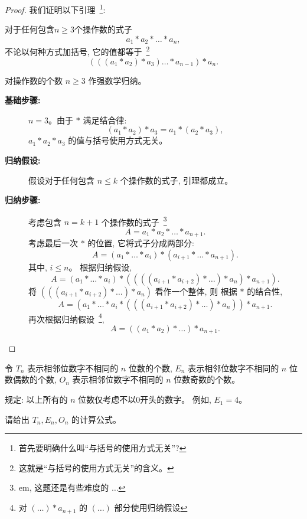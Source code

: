 \documentclass[a4paper, justified]{tufte-handout}
\begin{document}
\begin{proof}
  我们证明以下引理~\footnote{首先要明确什么叫``与括号的使用方式无关''?}:
  \begin{lemma*}
    对于任何包含$n \ge 3$个操作数的式子
    \[
      a_{1} \ast a_{2} \ast \dots \ast a_{n},
    \]
    不论以何种方式加括号, 它的值都等于~\footnote{这就是``与括号的使用方式无关''的含义。}
    \[
      (((a_{1} \ast a_{2}) \ast a_{3}) \dots \ast a_{n-1}) \ast a_{n}.
    \]
  \end{lemma*}

  \vspace{1em}
  \noindent 对操作数的个数 $n \ge 3$ 作强数学归纳。
  \begin{description}
    \item[{\bf 基础步骤:}] $n = 3$。由于 $\ast$ 满足结合律:
      \[
        (a_{1} \ast a_{2}) \ast a_{3} = a_{1} \ast (a_{2} \ast a_{3}),
      \]
      $a_{1} \ast a_{2} \ast a_{3}$ 的值与括号使用方式无关。
    \item[{\bf 归纳假设:}] 假设对于任何包含 $n \le k$ 个操作数的式子, 引理都成立。
    \item[{\bf 归纳步骤:}] 考虑包含 $n = k + 1$ 个操作数的式子~\footnote{em, 这题还是有些难度的 $\dots$}
      \[
        A = a_{1} \ast a_{2} \ast \dots \ast a_{n+1}.
      \]
      考虑最后一次 $\ast$ 的位置, 它将式子分成两部分:
      \[
        A = (a_{1} \ast \dots \ast a_{i}) \ast (a_{i+1} \ast \dots \ast a_{n+1}).
      \]
      其中, $i \le n$。
      根据归纳假设,
      \[
        A = (a_{1} \ast \dots \ast a_{i}) \ast
          (\boxed{(((a_{i+1} \ast a_{i+2}) \ast \dots) \ast a_{n})} \ast a_{n+1}).
      \]
      将 $\boxed{(((a_{i+1} \ast a_{i+2}) \ast \dots) \ast a_{n})}$ 看作一个整体, 则
      根据 $\ast$ 的结合性,
      \[
        A = (a_{1} \ast \dots \ast a_{i} \ast
          \boxed{(((a_{i+1} \ast a_{i+2}) \ast \dots) \ast a_{n})}) \ast a_{n+1}.
      \]
      再次根据归纳假设~\footnote{对 $(\dots) \ast a_{n+1}$ 的 $(\dots)$ 部分使用归纳假设},
      \[
        A = ((a_{1} \ast a_{2}) \ast \dots) \ast a_{n+1}.
      \]
  \end{description}
\end{proof}

\begin{problem}
  令 $T_{n}$ 表示相邻位数字不相同的 $n$ 位数的个数,
  $E_{n}$ 表示相邻位数字不相同的 $n$ 位数偶数的个数,
  $O_{n}$ 表示相邻位数字不相同的 $n$ 位数奇数的个数。

  \noindent 规定: 以上所有的 $n$ 位数仅考虑不以0开头的数字。
  例如, $E_{1} = 4$。

  \noindent 请给出 $T_{n}, E_{n}, O_{n}$ 的计算公式。
\end{problem}
\end{document}
